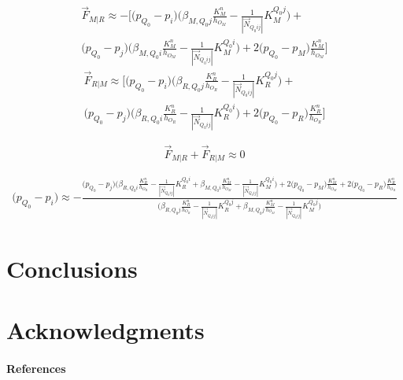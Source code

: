 \documentclass{article}
\begin{document}
		\begin{equation}
		\begin{split}
\vec{F}_{M|R} \approx  -\Bigg[ \big( p_{Q_{0}} - p_{i}\big) \Bigg( \beta_{M,Q_{0}j}\frac{K^n_{M}}{h_{O_{M}}} - \frac{1}{|\vec{N}_{Q_{0}ij}|}K^{Q_{0}j}_{M}\Bigg) + \\
\big( p_{Q_{0}} - p_{j} \big) \Bigg(\beta_{M,Q_{0}i}\frac{K^n_{M}}{h_{O_{M}}} - \frac{1}{|\vec{N}_{Q_{0}ij}|}K^{Q_{0}i}_{M}\Bigg)  + 
2 \big(p_{Q_{0}} - p_{M}\big) \frac{K^n_{M}}{h_{O_{M}}} \Bigg]
\end{split}
		\end{equation}
		\begin{equation}
		\begin{split}
\vec{F}_{R|M} \approx  \Bigg[ \big( p_{Q_{0}} - p_{i}\big) \Bigg( \beta_{R,Q_{0}j}\frac{K^n_{R}}{h_{O_{R}}} - \frac{1}{|\vec{N}_{Q_{0}ij}|}K^{Q_{0}j}_{R}\Bigg) + \\
\big( p_{Q_{0}} - p_{j} \big) \Bigg(\beta_{R,Q_{0}i}\frac{K^n_{R}}{h_{O_{R}}} - \frac{1}{|\vec{N}_{Q_{0}ij}|}K^{Q_{0}i}_{R}\Bigg)  + 
2 \big(p_{Q_{0}} - p_{R}\big) \frac{K^n_{R}}{h_{O_{R}}} \Bigg]
\end{split}
		\end{equation}
		
		\begin{equation}
		\vec{F}_{M|R} + \vec{F}_{R|M} \approx 0
		\end{equation}
		
		\begin{equation}
		\begin{split}
\big( p_{Q_{0}} - p_{i}\big) \approx -\frac{
\big( p_{Q_{0}} - p_{j} \big) \Bigg(\beta_{R,Q_{0}i}\frac{K^n_{R}}{h_{O_{R}}} - \frac{1}{|\vec{N}_{Q_{0}ij}|}K^{Q_{0}i}_{R}+\beta_{M,Q_{0}i}\frac{K^n_{M}}{h_{O_{M}}} - \frac{1}{|\vec{N}_{Q_{0}ij}|}K^{Q_{0}i}_{M}\Bigg)  + 
2 \big(p_{Q_{0}} - p_{M}\big) \frac{K^n_{M}}{h_{O_{M}}} +2 \big(p_{Q_{0}} - p_{R}\big) \frac{K^n_{R}}{h_{O_{R}}}}{\Bigg(  \beta_{R,Q_{0}j}\frac{K^n_{R}}{h_{O_{R}}} - \frac{1}{|\vec{N}_{Q_{0}ij}|}K^{Q_{0}j}_{R} + \beta_{M,Q_{0}j}\frac{K^n_{M}}{h_{O_{M}}} - \frac{1}{|\vec{N}_{Q_{0}ij}|}K^{Q_{0}j}_{M}\Bigg)}
\end{split}
		\end{equation}	
\section{Conclusions}

\section*{Acknowledgments}

\paragraph{References}
\end{document}
